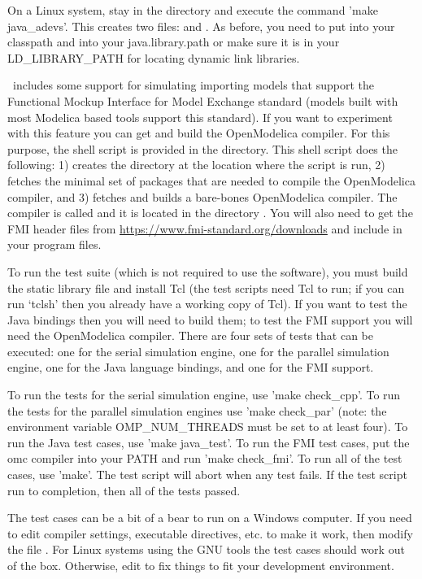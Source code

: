 On a Linux system, stay in the  directory and execute the command 'make java\_adevs'. This creates two files:  and . As before, you need to put  into your classpath and  into your java.library.path or make sure it is in your LD\_LIBRARY\_PATH for locating dynamic link libraries.

\adevs\ includes some support for simulating importing models that support the Functional Mockup Interface for Model Exchange standard (models built with most Modelica based tools support this standard). If you want to experiment with this feature you can get and build the OpenModelica compiler. For this purpose, the shell script  is provided in the  directory. This shell script does the following: 1) creates the directory  at the location where the script is run, 2) fetches the minimal set of packages that are needed to compile the OpenModelica compiler, and 3) fetches and builds a bare-bones OpenModelica compiler. The compiler is called  and it is located in the directory . You will also need to get the FMI header files from \url{https://www.fmi-standard.org/downloads} and include  in your program files.

To run the test suite (which is not required to use the software), you must build the static library file and install Tcl (the test scripts need Tcl to run; if you can run `tclsh' then you already have a working copy of Tcl). If you want to test the Java bindings then you will need to build them; to test the FMI support you will need the OpenModelica compiler. There are four sets of tests that can be executed: one for the serial simulation engine, one for the parallel simulation engine, one for the Java language bindings, and one for the FMI support.

To run the tests for the serial simulation engine, use 'make check\_cpp'. To run the tests for the parallel simulation engines use 'make check\_par' (note: the environment variable OMP\_NUM\_THREADS must be set to at least four). To run the Java test cases, use 'make java\_test'. To run the FMI test cases, put the omc compiler into your PATH and run 'make check\_fmi'. To run all of the test cases, use 'make'. The test script will abort when any test fails. If the test script run to completion, then all of the tests passed.

The test cases can be a bit of a bear to run on a Windows computer. If you need to edit compiler settings, executable directives, etc. to make it work, then modify the file . For Linux systems using the GNU tools the test cases should work out of the box. Otherwise, edit  to fix things to fit your development environment.
